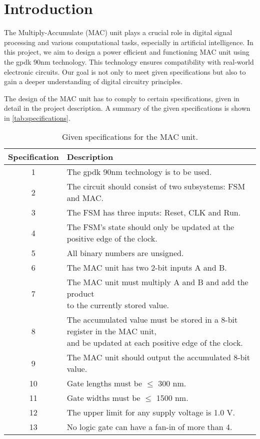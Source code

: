 \section{Introduction}
\label{sec:introduction}

The Multiply-Accumulate (MAC) unit plays a crucial role in digital signal processing and various computational tasks, especially in artificial intelligence. In this project, we aim to design a power efficient and functioning MAC unit using the gpdk 90nm technology. This technology ensures compatibility with real-world electronic circuits. Our goal is not only to meet given specifications but also to gain a deeper understanding of digital circuitry principles. 

The design of the MAC unit has to comply to certain specifications, given in detail in the project description\cite{project_description}. A summary of the given specifications is shown in \autoref{tab:specifications}.

\begin{table}[H]
\caption{Given specifications for the MAC unit.}
\label{tab:specifications}
\centering
\begin{tabular}{|c|l|}
\hline
\rowcolor[HTML]{C0C0C0} 
 Specification & Description \\ \hline
 1 & The gpdk 90nm technology is to be used. \\ \hline
 2 & The circuit should consist of two subsystems: FSM and MAC. \\ \hline
 3 & The FSM has three inputs: Reset, CLK and Run.  \\ \hline
 4 & The FSM’s state should only be updated at the positive edge of the clock. \\ \hline
 5 & All binary numbers are unsigned. \\ \hline
 6 & The MAC unit has two 2-bit inputs A and B. \\ \hline
 7 & \makecell[l]{The MAC unit must multiply A and B and add the product\\ to the currently stored value.}  \\ \hline
 8 & \makecell[l]{The accumulated value must be stored in a 8-bit register in the MAC unit,\\ and be updated at each positive edge of the clock.} \\ \hline
 9 & The MAC unit should output the accumulated 8-bit value. \\ \hline
 10 & Gate lengths must be $\le$ 300 nm. \\ \hline
 11 & Gate widths must be $\le$ 1500 nm. \\ \hline
 12 & The upper limit for any supply voltage is 1.0 V. \\ \hline
 13 & No logic gate can have a fan-in of more than 4. \\ \hline
\end{tabular}
\end{table}

